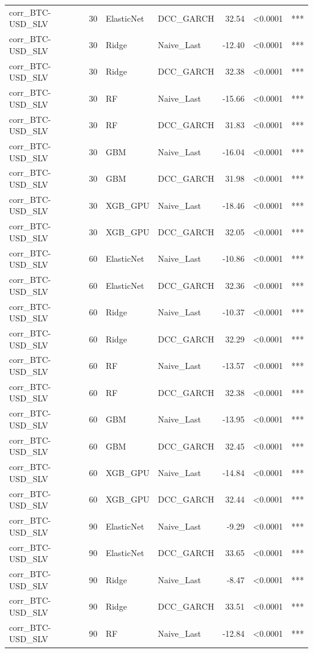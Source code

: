 \begin{table}[H]
\begin{tabular}{llllrrl}
corr_BTC-USD_SLV & 30 & ElasticNet & DCC_GARCH & 32.54 & <0.0001 & *** \\
corr_BTC-USD_SLV & 30 & Ridge & Naive_Last & -12.40 & <0.0001 & *** \\
corr_BTC-USD_SLV & 30 & Ridge & DCC_GARCH & 32.38 & <0.0001 & *** \\
corr_BTC-USD_SLV & 30 & RF & Naive_Last & -15.66 & <0.0001 & *** \\
corr_BTC-USD_SLV & 30 & RF & DCC_GARCH & 31.83 & <0.0001 & *** \\
corr_BTC-USD_SLV & 30 & GBM & Naive_Last & -16.04 & <0.0001 & *** \\
corr_BTC-USD_SLV & 30 & GBM & DCC_GARCH & 31.98 & <0.0001 & *** \\
corr_BTC-USD_SLV & 30 & XGB_GPU & Naive_Last & -18.46 & <0.0001 & *** \\
corr_BTC-USD_SLV & 30 & XGB_GPU & DCC_GARCH & 32.05 & <0.0001 & *** \\
corr_BTC-USD_SLV & 60 & ElasticNet & Naive_Last & -10.86 & <0.0001 & *** \\
corr_BTC-USD_SLV & 60 & ElasticNet & DCC_GARCH & 32.36 & <0.0001 & *** \\
corr_BTC-USD_SLV & 60 & Ridge & Naive_Last & -10.37 & <0.0001 & *** \\
corr_BTC-USD_SLV & 60 & Ridge & DCC_GARCH & 32.29 & <0.0001 & *** \\
corr_BTC-USD_SLV & 60 & RF & Naive_Last & -13.57 & <0.0001 & *** \\
corr_BTC-USD_SLV & 60 & RF & DCC_GARCH & 32.38 & <0.0001 & *** \\
corr_BTC-USD_SLV & 60 & GBM & Naive_Last & -13.95 & <0.0001 & *** \\
corr_BTC-USD_SLV & 60 & GBM & DCC_GARCH & 32.45 & <0.0001 & *** \\
corr_BTC-USD_SLV & 60 & XGB_GPU & Naive_Last & -14.84 & <0.0001 & *** \\
corr_BTC-USD_SLV & 60 & XGB_GPU & DCC_GARCH & 32.44 & <0.0001 & *** \\
corr_BTC-USD_SLV & 90 & ElasticNet & Naive_Last & -9.29 & <0.0001 & *** \\
corr_BTC-USD_SLV & 90 & ElasticNet & DCC_GARCH & 33.65 & <0.0001 & *** \\
corr_BTC-USD_SLV & 90 & Ridge & Naive_Last & -8.47 & <0.0001 & *** \\
corr_BTC-USD_SLV & 90 & Ridge & DCC_GARCH & 33.51 & <0.0001 & *** \\
corr_BTC-USD_SLV & 90 & RF & Naive_Last & -12.84 & <0.0001 & *** \\

\end{tabular}
\end{table}
